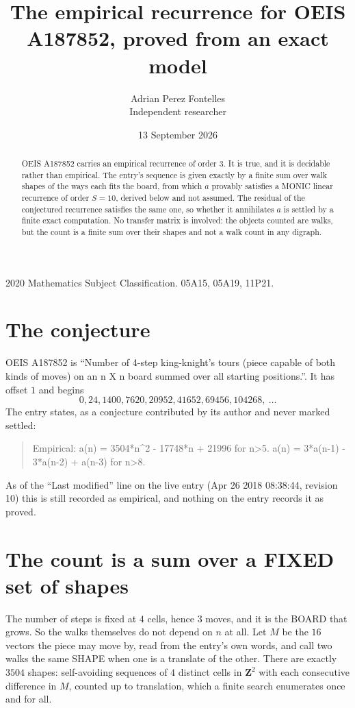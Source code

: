 \documentclass[11pt,a4paper]{article}
\title{The empirical recurrence for OEIS A187852, proved from an exact model}
\author{Adrian Perez Fontelles\\ \small Independent researcher}
\date{13 September 2026}
\theoremstyle{plain}
\theoremstyle{definition}
\begin{document}
\maketitle

\begin{abstract}
OEIS A187852 carries an empirical recurrence of order $3$. It is true, and it is
decidable rather than empirical. The entry's sequence is given exactly by a finite sum over walk shapes of the ways each fits the board, from
which $a$ provably satisfies a MONIC linear recurrence of order $S=10$, derived below and not
assumed. The residual of the conjectured recurrence satisfies the same one, so whether it
annihilates $a$ is settled by a finite exact computation. No transfer matrix is involved: the objects counted are walks, but the count is a finite sum over their shapes and not a walk count in any digraph.
\end{abstract}

\noindent\small 2020 Mathematics Subject Classification. 05A15, 05A19, 11P21.\normalsize

\section{The conjecture}

OEIS A187852 is ``Number of 4-step king-knight's tours (piece capable of both kinds of moves) on an n X n board summed over all starting positions.''. It has offset $1$ and begins
\[
0, 24, 1400, 7620, 20952, 41652, 69456, 104268,\ \dots
\]
The entry states, as a conjecture contributed by its author and never marked settled:
\begin{quote}
Empirical: a(n) = 3504*n\^{}2 - 17748*n + 21996 for n>5. a(n) = 3*a(n-1) - 3*a(n-2) + a(n-3) for n>8.
\end{quote}
As of the ``Last modified'' line on the live entry (Apr 26 2018 08:38:44, revision 10)
this is still recorded as empirical, and nothing on the entry records it as proved.

\section{The count is a sum over a FIXED set of shapes}

The number of steps is fixed at $4$ cells, hence $3$ moves, and it is the BOARD
that grows. So the walks themselves do not depend on $n$ at all. Let $M$ be the $16$
vectors the piece may move by, read from the entry's own words, and call two walks the same
SHAPE when one is a translate of the other. There are exactly $3504$ shapes: self-avoiding
sequences of $4$ distinct cells in $\mathbf{Z}^{2}$ with each consecutive difference in
$M$, counted up to translation, which a finite search enumerates once and for all.
\end{document}
